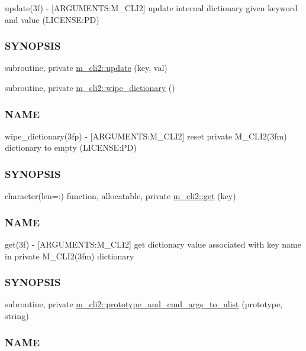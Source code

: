\begin{DoxyCompactItemize}
\begin{DoxyCompactList}
update(3f) -\/ \mbox{[}A\+R\+G\+U\+M\+E\+N\+TS\+:M\+\_\+\+C\+L\+I2\mbox{]} update internal dictionary given keyword and value (L\+I\+C\+E\+N\+SE\+:PD) \subsubsection*{S\+Y\+N\+O\+P\+S\+IS}\end{DoxyCompactList}\item 
subroutine, private \mbox{\hyperlink{namespacem__cli2_a160d56bc4a10faef7e8a8a4f04f4dadb}{m\+\_\+cli2\+::update}} (key, val)
\item 
subroutine, private \mbox{\hyperlink{namespacem__cli2_ab1525b0419475486f520ef502daa5e94}{m\+\_\+cli2\+::wipe\+\_\+dictionary}} ()
\begin{DoxyCompactList}\small\item\em \subsubsection*{N\+A\+ME}

wipe\+\_\+dictionary(3fp) -\/ \mbox{[}A\+R\+G\+U\+M\+E\+N\+TS\+:M\+\_\+\+C\+L\+I2\mbox{]} reset private M\+\_\+\+C\+L\+I2(3fm) dictionary to empty (L\+I\+C\+E\+N\+SE\+:PD) \subsubsection*{S\+Y\+N\+O\+P\+S\+IS}\end{DoxyCompactList}\item 
character(len=\+:) function, allocatable, private \mbox{\hyperlink{namespacem__cli2_aa92e8ad0300d4e324e29eae1ab9d04b4}{m\+\_\+cli2\+::get}} (key)
\begin{DoxyCompactList}\small\item\em \subsubsection*{N\+A\+ME}

get(3f) -\/ \mbox{[}A\+R\+G\+U\+M\+E\+N\+TS\+:M\+\_\+\+C\+L\+I2\mbox{]} get dictionary value associated with key name in private M\+\_\+\+C\+L\+I2(3fm) dictionary \subsubsection*{S\+Y\+N\+O\+P\+S\+IS}\end{DoxyCompactList}\item 
subroutine, private \mbox{\hyperlink{namespacem__cli2_a06f8bb6dd63fd7ac2a91b46ee89baaa9}{m\+\_\+cli2\+::prototype\+\_\+and\+\_\+cmd\+\_\+args\+\_\+to\+\_\+nlist}} (prototype, string)
\begin{DoxyCompactList}\small\item\em \subsubsection*{N\+A\+ME}


\end{DoxyCompactList}
\end{DoxyCompactItemize}
